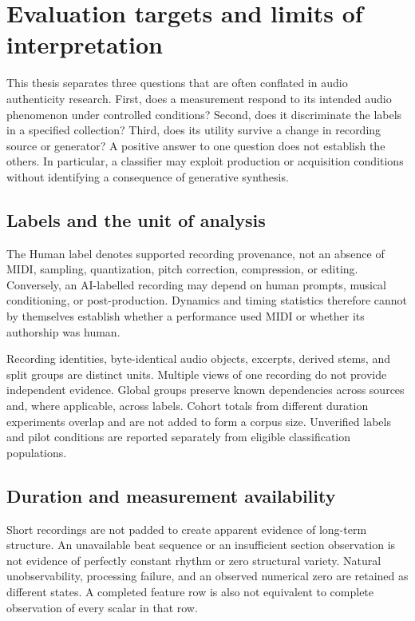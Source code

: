 \section{Evaluation targets and limits of interpretation}
\label{sec:final-evaluation-principles}

This thesis separates three questions that are often conflated in audio
authenticity research. First, does a measurement respond to its intended audio
phenomenon under controlled conditions? Second, does it discriminate the labels
in a specified collection? Third, does its utility survive a change in recording
source or generator? A positive answer to one question does not establish the
others. In particular, a classifier may exploit production or acquisition
conditions without identifying a consequence of generative synthesis.

\subsection{Labels and the unit of analysis}

The Human label denotes supported recording provenance, not an absence of MIDI,
sampling, quantization, pitch correction, compression, or editing. Conversely,
an AI-labelled recording may depend on human prompts, musical conditioning, or
post-production. Dynamics and timing statistics therefore cannot by themselves
establish whether a performance used MIDI or whether its authorship was human.

Recording identities, byte-identical audio objects, excerpts, derived stems,
and split groups are distinct units. Multiple views of one recording do not
provide independent evidence. Global groups preserve known dependencies across
sources and, where applicable, across labels. Cohort totals from different
duration experiments overlap and are not added to form a corpus size.
Unverified labels and pilot conditions are reported separately from eligible
classification populations.

\subsection{Duration and measurement availability}

Short recordings are not padded to create apparent evidence of long-term
structure. An unavailable beat sequence or an insufficient section observation
is not evidence of perfectly constant rhythm or zero structural variety.
Natural unobservability, processing failure, and an observed numerical zero are
retained as different states. A completed feature row is also not equivalent to
complete observation of every scalar in that row.

